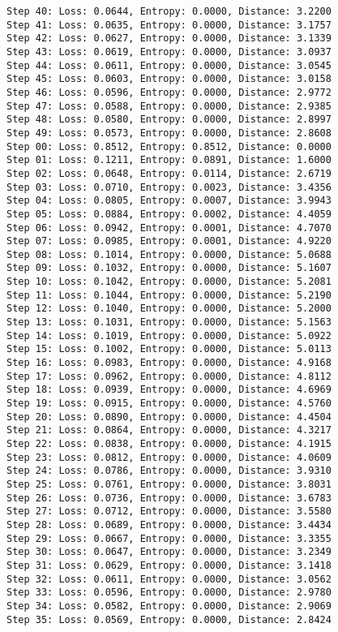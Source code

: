 \documentclass[11pt]{article}
\begin{document}
\begin{Verbatim}[commandchars=\\\{\}]
Step 40: Loss: 0.0644, Entropy: 0.0000, Distance: 3.2200
Step 41: Loss: 0.0635, Entropy: 0.0000, Distance: 3.1757
Step 42: Loss: 0.0627, Entropy: 0.0000, Distance: 3.1339
Step 43: Loss: 0.0619, Entropy: 0.0000, Distance: 3.0937
Step 44: Loss: 0.0611, Entropy: 0.0000, Distance: 3.0545
Step 45: Loss: 0.0603, Entropy: 0.0000, Distance: 3.0158
Step 46: Loss: 0.0596, Entropy: 0.0000, Distance: 2.9772
Step 47: Loss: 0.0588, Entropy: 0.0000, Distance: 2.9385
Step 48: Loss: 0.0580, Entropy: 0.0000, Distance: 2.8997
Step 49: Loss: 0.0573, Entropy: 0.0000, Distance: 2.8608
Step 00: Loss: 0.8512, Entropy: 0.8512, Distance: 0.0000
Step 01: Loss: 0.1211, Entropy: 0.0891, Distance: 1.6000
Step 02: Loss: 0.0648, Entropy: 0.0114, Distance: 2.6719
Step 03: Loss: 0.0710, Entropy: 0.0023, Distance: 3.4356
Step 04: Loss: 0.0805, Entropy: 0.0007, Distance: 3.9943
Step 05: Loss: 0.0884, Entropy: 0.0002, Distance: 4.4059
Step 06: Loss: 0.0942, Entropy: 0.0001, Distance: 4.7070
Step 07: Loss: 0.0985, Entropy: 0.0001, Distance: 4.9220
Step 08: Loss: 0.1014, Entropy: 0.0000, Distance: 5.0688
Step 09: Loss: 0.1032, Entropy: 0.0000, Distance: 5.1607
Step 10: Loss: 0.1042, Entropy: 0.0000, Distance: 5.2081
Step 11: Loss: 0.1044, Entropy: 0.0000, Distance: 5.2190
Step 12: Loss: 0.1040, Entropy: 0.0000, Distance: 5.2000
Step 13: Loss: 0.1031, Entropy: 0.0000, Distance: 5.1563
Step 14: Loss: 0.1019, Entropy: 0.0000, Distance: 5.0922
Step 15: Loss: 0.1002, Entropy: 0.0000, Distance: 5.0113
Step 16: Loss: 0.0983, Entropy: 0.0000, Distance: 4.9168
Step 17: Loss: 0.0962, Entropy: 0.0000, Distance: 4.8112
Step 18: Loss: 0.0939, Entropy: 0.0000, Distance: 4.6969
Step 19: Loss: 0.0915, Entropy: 0.0000, Distance: 4.5760
Step 20: Loss: 0.0890, Entropy: 0.0000, Distance: 4.4504
Step 21: Loss: 0.0864, Entropy: 0.0000, Distance: 4.3217
Step 22: Loss: 0.0838, Entropy: 0.0000, Distance: 4.1915
Step 23: Loss: 0.0812, Entropy: 0.0000, Distance: 4.0609
Step 24: Loss: 0.0786, Entropy: 0.0000, Distance: 3.9310
Step 25: Loss: 0.0761, Entropy: 0.0000, Distance: 3.8031
Step 26: Loss: 0.0736, Entropy: 0.0000, Distance: 3.6783
Step 27: Loss: 0.0712, Entropy: 0.0000, Distance: 3.5580
Step 28: Loss: 0.0689, Entropy: 0.0000, Distance: 3.4434
Step 29: Loss: 0.0667, Entropy: 0.0000, Distance: 3.3355
Step 30: Loss: 0.0647, Entropy: 0.0000, Distance: 3.2349
Step 31: Loss: 0.0629, Entropy: 0.0000, Distance: 3.1418
Step 32: Loss: 0.0611, Entropy: 0.0000, Distance: 3.0562
Step 33: Loss: 0.0596, Entropy: 0.0000, Distance: 2.9780
Step 34: Loss: 0.0582, Entropy: 0.0000, Distance: 2.9069
Step 35: Loss: 0.0569, Entropy: 0.0000, Distance: 2.8424

\end{Verbatim}
\end{document}
